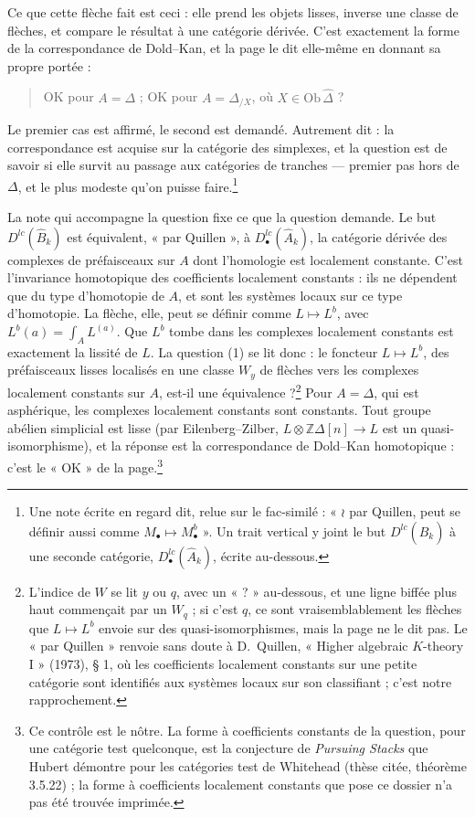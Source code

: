 \documentclass[11pt,a4paper]{article}
\begin{document}
Ce que cette flèche fait est ceci : elle prend les objets lisses, inverse une
classe de flèches, et compare le résultat à une catégorie dérivée. C'est
exactement la forme de la correspondance de Dold--Kan, et la page le dit
elle-même en donnant sa propre portée :

\begin{quote}
OK pour $A = \Delta$ ; OK pour $A = \Delta_{/X}$, où $X \in
\mathrm{Ob}\,\hat{\Delta}$ ?
\end{quote}

Le premier cas est affirmé, le second est demandé. Autrement dit : la
correspondance est acquise sur la catégorie des simplexes, et la question est de
savoir si elle survit au passage aux catégories de tranches --- premier pas hors
de $\Delta$, et le plus modeste qu'on puisse faire.\footnote{Une note écrite en
regard dit, relue sur le fac-similé : « $\wr$ par Quillen, peut se définir aussi
comme $M_{\bullet} \mapsto M_{\bullet}^{b}$ ». Un trait vertical y joint le but
$D^{lc}(\hat{B}_{k})$ à une seconde catégorie, $D^{lc}_{\bullet}(\hat{A}_{k})$,
écrite au-dessous.}

La note qui accompagne la question fixe ce que la question demande. Le but
$D^{lc}(\hat{B}_{k})$ est équivalent, « par Quillen », à
$D^{lc}_{\bullet}(\hat{A}_{k})$, la catégorie dérivée des complexes de
préfaisceaux sur $A$ dont l'homologie est localement constante. C'est
l'invariance homotopique des coefficients localement constants : ils ne
dépendent que du type d'homotopie de $A$, et sont les systèmes locaux sur ce
type d'homotopie. La flèche, elle, peut se définir comme $L \mapsto L^{b}$, avec
$L^{b}(a) = \int_{A} L^{(a)}$. Que $L^{b}$ tombe dans les complexes localement
constants est exactement la lissité de $L$. La question (1) se lit donc : le
foncteur $L \mapsto L^{b}$, des préfaisceaux lisses localisés en une classe
$W_{y}$ de flèches vers les complexes localement constants sur $A$, est-il une
équivalence ?\footnote{L'indice de $W$ se lit $y$ ou $q$, avec un « ? »
au-dessous, et une ligne biffée plus haut commençait par un $W_{q}$ ; si c'est
$q$, ce sont vraisemblablement les flèches que $L \mapsto L^{b}$ envoie sur des
quasi-isomorphismes, mais la page ne le dit pas. Le « par Quillen » renvoie sans
doute à D.~Quillen, « Higher algebraic $K$-theory I » (1973), § 1, où les
coefficients localement constants sur une petite catégorie sont identifiés aux
systèmes locaux sur son classifiant ; c'est notre rapprochement.} Pour
$A = \Delta$, qui est asphérique, les complexes localement constants sont
constants. Tout groupe abélien simplicial est lisse (par Eilenberg--Zilber,
$L \otimes \mathbb{Z}\Delta[n] \to L$ est un quasi-isomorphisme), et la
réponse est la correspondance de Dold--Kan homotopique : c'est le « OK » de la
page.\footnote{Ce contrôle est le nôtre. La forme à coefficients constants de
la question, pour une catégorie test quelconque, est la conjecture de
\emph{Pursuing Stacks} que Hubert démontre pour les catégories test de
Whitehead (thèse citée, théorème 3.5.22) ; la forme à coefficients
localement constants que pose ce dossier n'a pas été trouvée imprimée.}
\end{document}
